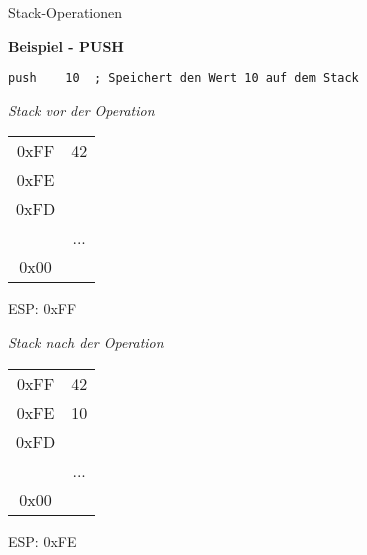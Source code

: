 \begin{frame}[fragile]{Stack-Operationen}

\begin{center}
\textbf{Beispiel - PUSH}
\end{center}

\begin{lstlisting}
push    10  ; Speichert den Wert 10 auf dem Stack
\end{lstlisting}

\begin{multicols}{2}
\begin{minipage}{5cm}
\emph{Stack vor der Operation}\\
\begin{tabular}{c|c|}
    \cline{2-2}
   0xFF & 42\\ \cline{2-2}
   0xFE & \\ \cline{2-2}
   0xFD & \\ \cline{2-2}
        & ... \\ \cline{2-2}
   0x00 & \\ \cline{2-2}
\end{tabular}
ESP: 0xFF
\end{minipage}

\begin{minipage}{5cm}
\emph{Stack nach der Operation}\\
\begin{tabular}{c|c|}
    \cline{2-2}
   0xFF & 42\\ \cline{2-2}
   0xFE & 10\\ \cline{2-2}
   0xFD & \\ \cline{2-2}
          & ... \\ \cline{2-2}
     0x00 & \\ \cline{2-2}
\end{tabular}
ESP: 0xFE
\end{minipage}
\end{multicols}
\end{frame}


